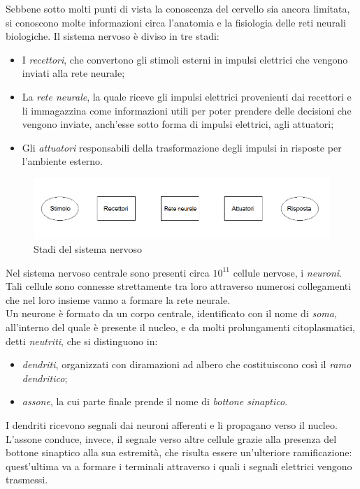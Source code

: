 \documentclass[12pt,a4paper,oneside]{book}
\begin{document}
  		Sebbene sotto molti punti di vista la conoscenza del cervello sia ancora limitata, si conoscono molte informazioni circa l’anatomia e la fisiologia delle reti neurali biologiche.
  		Il sistema nervoso è diviso in tre stadi:
		\begin{itemize}
			\item I \emph{recettori}, che convertono gli stimoli esterni in impulsi elettrici che vengono inviati alla rete neurale;
			\item La \emph{rete neurale}, la quale riceve gli impulsi elettrici provenienti dai recettori e li immagazzina come informazioni utili per poter prendere delle decisioni che vengono inviate, anch'esse sotto forma di impulsi elettrici, agli attuatori;
			\item Gli \emph{attuatori} responsabili della trasformazione degli impulsi in risposte per l'ambiente esterno.
		\end{itemize}
		
		\begin{figure}[h]
		\centering
		\includegraphics[width=1\linewidth]{IMMAGINI/Sistemanervoso}
		\caption{Stadi del sistema nervoso}
		\label{fig: stadi sistema nervoso}
		\end{figure}
		
		 Nel sistema nervoso centrale sono presenti circa $10^{11}$ cellule nervose, i \emph{neuroni}. Tali cellule sono connesse strettamente tra loro attraverso numerosi collegamenti che nel loro insieme vanno a formare la rete neurale. \\
		 Un neurone è formato da un corpo centrale, identificato con il nome di \emph{soma}, all'interno del quale è presente il nucleo, e da molti prolungamenti citoplasmatici, detti \emph{neutriti}, che si distinguono in:
		 \begin{itemize}
		 	\item \emph{dendriti}, organizzati con diramazioni ad albero che costituiscono così il \emph{ramo dendritico};
		 	\item \emph{assone}, la cui parte finale prende il nome di \emph{bottone sinaptico}.
		 \end{itemize}
		 
		 I dendriti ricevono segnali dai neuroni afferenti e li propagano verso il nucleo. L'assone conduce, invece, il segnale verso altre cellule grazie alla presenza del bottone sinaptico alla sua estremità, che risulta essere un'ulteriore ramificazione: quest'ultima va a formare i terminali attraverso i quali i segnali elettrici vengono trasmessi. 
		 
\end{document}
